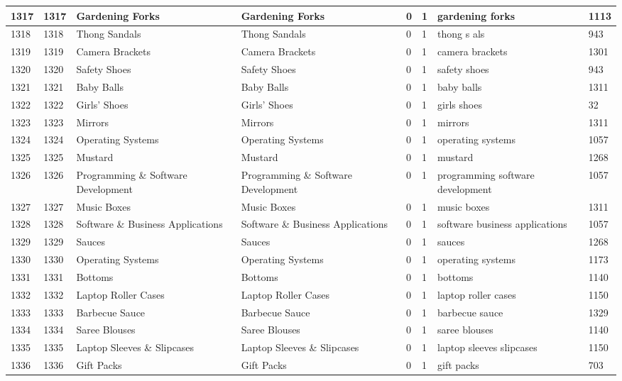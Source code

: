 \begin{longtable}{|l|l|l|l|l|l|l|l|}
1317 & 1317 & Gardening Forks & Gardening Forks & 0 & 1 & gardening forks & 1113 \\ \hline 
1318 & 1318 & Thong Sandals & Thong Sandals & 0 & 1 & thong s als & 943 \\ \hline 
1319 & 1319 & Camera Brackets & Camera Brackets & 0 & 1 & camera brackets & 1301 \\ \hline 
1320 & 1320 & Safety Shoes & Safety Shoes & 0 & 1 & safety shoes & 943 \\ \hline 
1321 & 1321 & Baby Balls & Baby Balls & 0 & 1 & baby balls & 1311 \\ \hline 
1322 & 1322 & Girls' Shoes & Girls' Shoes & 0 & 1 & girls shoes & 32 \\ \hline 
1323 & 1323 & Mirrors & Mirrors & 0 & 1 & mirrors & 1311 \\ \hline 
1324 & 1324 & Operating Systems & Operating Systems & 0 & 1 & operating systems & 1057 \\ \hline 
1325 & 1325 & Mustard & Mustard & 0 & 1 & mustard & 1268 \\ \hline 
1326 & 1326 & Programming \& Software Development & Programming \& Software Development & 0 & 1 & programming software development & 1057 \\ \hline 
1327 & 1327 & Music Boxes & Music Boxes & 0 & 1 & music boxes & 1311 \\ \hline 
1328 & 1328 & Software \& Business Applications & Software \& Business Applications & 0 & 1 & software business applications & 1057 \\ \hline 
1329 & 1329 & Sauces & Sauces & 0 & 1 & sauces & 1268 \\ \hline 
1330 & 1330 & Operating Systems & Operating Systems & 0 & 1 & operating systems & 1173 \\ \hline 
1331 & 1331 & Bottoms & Bottoms & 0 & 1 & bottoms & 1140 \\ \hline 
1332 & 1332 & Laptop Roller Cases & Laptop Roller Cases & 0 & 1 & laptop roller cases & 1150 \\ \hline 
1333 & 1333 & Barbecue Sauce & Barbecue Sauce & 0 & 1 & barbecue sauce & 1329 \\ \hline 
1334 & 1334 & Saree Blouses & Saree Blouses & 0 & 1 & saree blouses & 1140 \\ \hline 
1335 & 1335 & Laptop Sleeves \& Slipcases & Laptop Sleeves \& Slipcases & 0 & 1 & laptop sleeves slipcases & 1150 \\ \hline 
1336 & 1336 & Gift Packs & Gift Packs & 0 & 1 & gift packs & 703 \\ \hline 

\end{longtable}
